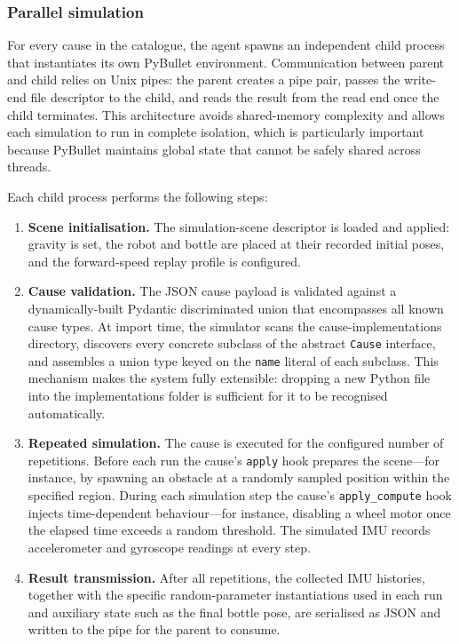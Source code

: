 \documentclass[a4paper, twoside]{article}
\begin{document}
\subsubsection{Parallel simulation}

For every cause in the catalogue, the agent spawns an independent child process that instantiates its own PyBullet environment.
Communication between parent and child relies on Unix pipes: the parent creates a pipe pair, passes the write-end file descriptor to the child, and reads the result from the read end once the child terminates.
This architecture avoids shared-memory complexity and allows each simulation to run in complete isolation, which is particularly important because PyBullet maintains global state that cannot be safely shared across threads.

Each child process performs the following steps:

\begin{enumerate}
    \item \textbf{Scene initialisation.} The simulation-scene descriptor is loaded and applied: gravity is set, the robot and bottle are placed at their recorded initial poses, and the forward-speed replay profile is configured.
    \item \textbf{Cause validation.} The JSON cause payload is validated against a dynamically-built Pydantic discriminated union that encompasses all known cause types. At import time, the simulator scans the cause-implementations directory, discovers every concrete subclass of the abstract \texttt{Cause} interface, and assembles a union type keyed on the \texttt{name} literal of each subclass. This mechanism makes the system fully extensible: dropping a new Python file into the implementations folder is sufficient for it to be recognised automatically.
    \item \textbf{Repeated simulation.} The cause is executed for the configured number of repetitions. Before each run the cause's \texttt{apply} hook prepares the scene---for instance, by spawning an obstacle at a randomly sampled position within the specified region. During each simulation step the cause's \texttt{apply\_compute} hook injects time-dependent behaviour---for instance, disabling a wheel motor once the elapsed time exceeds a random threshold. The simulated IMU records accelerometer and gyroscope readings at every step.
    \item \textbf{Result transmission.} After all repetitions, the collected IMU histories, together with the specific random-parameter instantiations used in each run and auxiliary state such as the final bottle pose, are serialised as JSON and written to the pipe for the parent to consume.
\end{enumerate}
\end{document}
